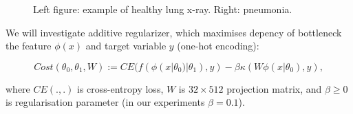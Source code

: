 \documentclass{article}
\begin{document}
\begin{figure}%
	\centering
	\qquad
	\caption{Left figure: example of healthy lung x-ray. Right: pneumonia.}
	\label{fig:Pneumonia_dataset_examples}
\end{figure}


We will investigate additive regularizer, which maximises depency of bottleneck the feature $\phi(x)$ and target variable $y$ (one-hot encoding): 


\begin{equation}
Cost(\theta_{0},\theta_{1}, W) := CE(f(\phi(x|\theta_{0})|\theta_{1}),y) - \beta \kappa(W\phi(x|\theta_{0}),y),
\end{equation}

\noindent where $CE(.,.)$ is cross-entropy loss, $W$ is $32\times 512$ projection matrix, and $\beta \geq 0$ is regularisation parameter (in our experiments $\beta = 0.1$).
\end{document}
